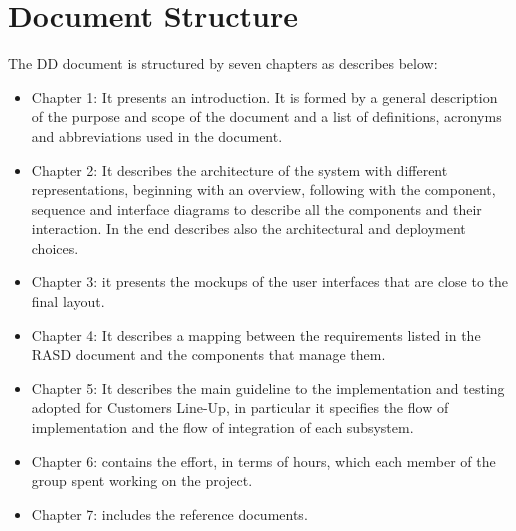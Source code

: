 \section{Document Structure}
The DD document is structured by seven chapters as describes below:\\

\begin{itemize}
	\item Chapter 1: It presents an introduction. It is formed by a general description of the purpose and scope of the document and a list of definitions, acronyms and abbreviations used in the document.
	\item Chapter 2: It describes the architecture of the system with different representations, beginning with an overview, following with the component, sequence and interface diagrams to describe all the components and their interaction. In the end describes also the architectural and deployment choices.
	\item Chapter 3: it presents the mockups of the user interfaces that are close to the final layout.
	\item Chapter 4: It describes a mapping between the requirements listed in the RASD document and the components that manage them.
	\item Chapter 5: It describes the main guideline to the implementation and testing adopted for Customers Line-Up, in particular it specifies the flow of implementation and the flow of integration of each subsystem.
	\item Chapter 6: contains the effort, in terms of hours, which each member of the group spent working on the project.
	\item Chapter 7: includes the reference documents.
\end{itemize}